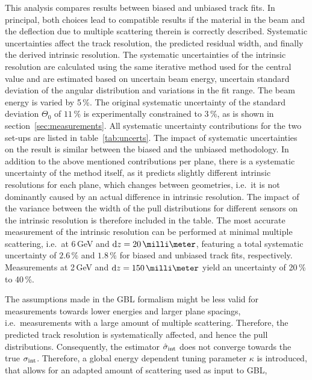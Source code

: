 This analysis compares results between biased and unbiased track fits. 
In principal, both choices lead to compatible results if the material in the beam and the deflection due to multiple scattering therein is correctly described. 
Systematic uncertainties affect the track resolution, the predicted residual width, and finally the derived intrinsic resolution. 
The systematic uncertainties of the intrinsic resolution are calculated using the same iterative method used for the central value and
 are estimated based on uncertain beam energy, uncertain standard deviation of the angular distribution and variations in the fit range. 
The beam energy is varied by 5\,\%. 
The original systematic uncertainty of the standard deviation $\Theta_{0}$ of $11\,\%$ is experimentally constrained to 3\,\%, as is shown in section~\ref{sec:measurements}. 
All systematic uncertainty contributions for the two set-ups are listed in table~\ref{tab:uncerts}. 
The impact of systematic uncertainties on the result is similar between the biased and the unbiased methodology. 
In addition to the above mentioned contributions per plane,
 there is a systematic uncertainty of the method itself, as it predicts slightly different intrinsic resolutions for each plane, which changes between geometries,
 i.e.\ it is not dominantly caused by an actual difference in intrinsic resolution. 
The impact of the variance between the width of the pull distributions for different sensors on the intrinsic resolution is therefore included in the table. 
The most accurate measurement of the intrinsic resolution can be performed at minimal multiple scattering, i.e.\ at 6\,GeV and $\dz = 20\,\milli\meter$,
 featuring a total systematic uncertainty of $2.6\,\%$ and $1.8\,\%$ for biased and unbiased track fits, respectively. 
Measurements at 2\,GeV and $\dz = 150\,\milli\meter$ yield an uncertainty of 20\,\% to 40\,\%. 

The assumptions made in the GBL formalism might be less valid for measurements towards lower energies and larger plane spacings, i.e.\ measurements with a large amount of multiple scattering. 
Therefore, the predicted track resolution is systematically affected, and hence the pull distributions. 
Consequently, the estimator $\hat{\sigma}_{\textrm{int}}$ does not converge towards the true $\sigma_{\textrm{int}}$. 
Therefore, a global energy dependent tuning parameter $\kappa$ is introduced,
 that allows for an adapted amount of scattering used as input to GBL,

